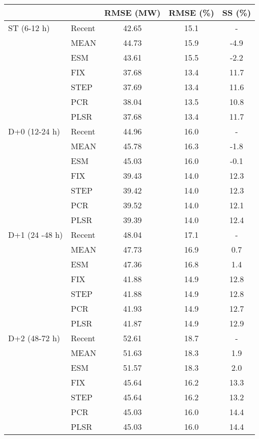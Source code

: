 \begin{table}[!htp]
\small
\centering
{}
\label{tb:sum_tle}
\begin{tabular}{llccc}
    \toprule
	&		&	RMSE (MW)	&	RMSE (\%)	&	SS (\%)	\\
\midrule								
ST (6-12 h)	&	Recent	&	42.65	&	15.1	&	-	\\
	        &	MEAN	&	44.73	&	15.9	&	-4.9	\\
        	&	ESM	    &	43.61	&	15.5	&	-2.2	\\
        	&	FIX	    &	37.68	&	13.4	&	11.7	\\
        	&	STEP	&	37.69	&	13.4	&	11.6	\\
        	&	PCR	    &	38.04	&	13.5	&	10.8	\\
        	&	PLSR	&	37.68	&	13.4	&	11.7	\\
\midrule
D+0 (12-24 h) &	Recent	&	44.96	&	16.0	&	-	\\
        	&	MEAN	&	45.78	&	16.3	&	-1.8	\\
        	&	ESM	    &	45.03	&	16.0	&	-0.1	\\
        	&	FIX	    &	39.43	&	14.0	&	12.3	\\
        	&	STEP	&	39.42	&	14.0	&	12.3	\\
        	&	PCR	    &	39.52	&	14.0	&	12.1	\\
        	&	PLSR	&	39.39	&	14.0	&	12.4	\\
\midrule
D+1 (24 -48 h)&	Recent	&	48.04	&	17.1	&	-	\\
        	&	MEAN	&	47.73	&	16.9	&	0.7	\\
        	&	ESM	    &	47.36	&	16.8	&	1.4	\\
        	&	FIX	    &	41.88	&	14.9	&	12.8	\\
        	&	STEP	&	41.88	&	14.9	&	12.8	\\
        	&	PCR	    &	41.93	&	14.9	&	12.7	\\
        	&	PLSR	&	41.87	&	14.9	&	12.9	\\
\midrule
D+2 (48-72 h)&	Recent	&	52.61	&	18.7	&	-	\\
        	&	MEAN	&	51.63	&	18.3	&	1.9	\\
        	&	ESM	    &	51.57	&	18.3	&	2.0	\\
        	&	FIX	    &	45.64	&	16.2	&	13.3	\\
        	&	STEP	&	45.64	&	16.2	&	13.2	\\
        	&	PCR	    &	45.03	&	16.0	&	14.4	\\
        	&	PLSR	&	45.03	&	16.0	&	14.4	\\
\bottomrule
\end{tabular}
\end{table}
\FloatBarrier

